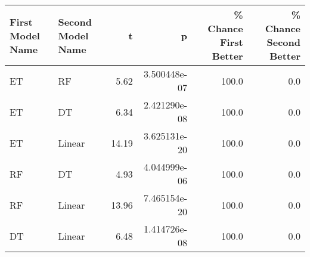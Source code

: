 \begin{tabular}{llrrrr}
\toprule
First Model Name & Second Model Name &     t &            p &  \% Chance First Better &  \% Chance Second Better \\
\midrule
              ET &                RF &  5.62 & 3.500448e-07 &                  100.0 &                     0.0 \\
              ET &                DT &  6.34 & 2.421290e-08 &                  100.0 &                     0.0 \\
              ET &            Linear & 14.19 & 3.625131e-20 &                  100.0 &                     0.0 \\
              RF &                DT &  4.93 & 4.044999e-06 &                  100.0 &                     0.0 \\
              RF &            Linear & 13.96 & 7.465154e-20 &                  100.0 &                     0.0 \\
              DT &            Linear &  6.48 & 1.414726e-08 &                  100.0 &                     0.0 \\
\bottomrule
\end{tabular}

